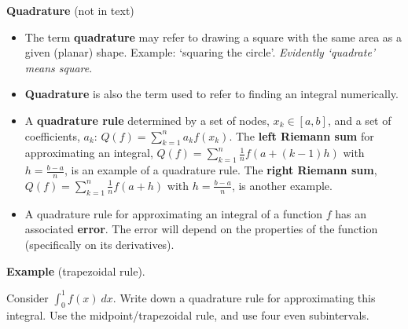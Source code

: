 \documentclass[12pt,letterpaper,noanswers]{exam}
\begin{document}
\noindent\textbf{Quadrature} (not in text)
\begin{tcolorbox}
\begin{itemize}
\itemsep0em
    \item The term \textbf{quadrature} may refer to drawing a square with the same area as a given (planar) shape.  Example: `squaring the circle'.  \emph{Evidently `quadrate' means square}.
    \item \textbf{Quadrature} is also the term used to refer to finding an integral numerically.
    \item A \textbf{quadrature rule} determined by a set of nodes, $x_k \in [a,b]$, and a set of coefficients, $a_k$: $\displaystyle Q(f) = \sum\limits_{k=1}^n a_k f(x_k)$.  The \textbf{left Riemann sum} for approximating an integral, $\displaystyle Q(f) = \sum\limits_{k=1}^n \frac{1}{n}f(a + (k-1)h)$ with $h = \frac{b-a}{n}$,  is an example of a quadrature rule.  The \textbf{right Riemann sum}, $\displaystyle Q(f) = \sum\limits_{k=1}^n \frac{1}{n}f(a + h)$ with $h = \frac{b-a}{n}$, is another example.
    \item A quadrature rule for approximating an integral of a function $f$ has an associated \textbf{error}.  The error will depend on the properties of the function (specifically on its derivatives).
\end{itemize}
\end{tcolorbox}

\noindent\textbf{Example} (trapezoidal rule).

Consider $\int_0^1 f(x)\ dx$.  Write down a quadrature rule for approximating this integral.  Use the midpoint/trapezoidal rule, and use four even subintervals.
\vspace{1in}
\end{document}
